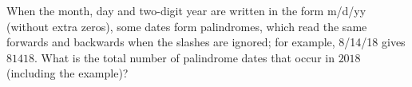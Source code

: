 When the month, day and two-digit year are written in the form m/d/yy (without extra zeros), some dates form palindromes, which read the same forwards and backwards when the slashes are ignored; for example, 8/14/18 gives $81418$. What is the total number of palindrome dates that occur in $2018$ (including the example)?
